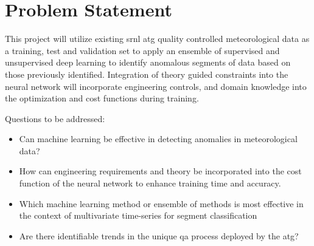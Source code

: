 \section{Problem Statement}
\label{sec:problem}

This project will utilize existing \gls{srnl} \gls{atg} quality controlled meteorological data as a training, test and validation set to apply an ensemble of supervised and unsupervised deep learning to identify anomalous segments of data based on those previously identified.  Integration of theory guided constraints into the neural network will incorporate engineering controls, and domain knowledge into the optimization and cost functions during training.

Questions to be addressed:

\begin{itemize}
    \item Can machine learning be effective in detecting anomalies in meteorological data?
    \item How can engineering requirements and theory be incorporated into the cost function of the neural network to enhance training time and accuracy.
    \item Which machine learning method or ensemble of methods is most effective in the context of multivariate time-series for segment classification
    \item Are there identifiable trends in the unique \gls{qa} process deployed by the \gls{atg}?
\end{itemize}
